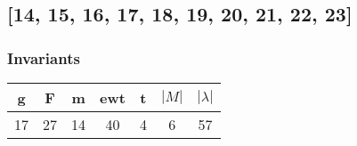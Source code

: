 \documentclass[a4paper]{article}
\begin{document}
\newpage\subsection{[14, 15, 16, 17, 18, 19, 20, 21, 22, 23]}
\noindent\begin{minipage}{0.6\textwidth}
\subsubsection*{Invariants}
\centering
\begin{tabular}{|c|c|c|c|c|c|c|}
\toprule
g & F & m & ewt & t & \(|M|\) & \(|\lambda|\) \\
\midrule
17 & 27 & 14 & 40 & 4 & 6 & 57 \\
\bottomrule
\end{tabular}
\end{minipage}%
\end{document}

